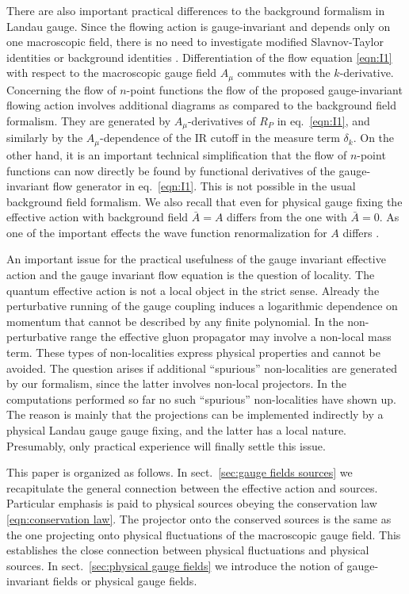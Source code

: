 \documentclass[twocolumn,aps,prd,amsmath,amssymb,preprintnumbers,longbibliography]{revtex4-1}
\numberwithin{equation}{section}
\begin{document}
There are also important practical differences to the background formalism in Landau gauge. Since the flowing action is gauge-invariant and depends only on one macroscopic field, there is no need to investigate modified Slavnov-Taylor identities or background identities \cite{R53,R54,R55,R56,R57,R58,R59}. Differentiation of the flow equation \eqref{eqn:I1} with respect to the macroscopic gauge field $A_\mu$ commutes with the $k$-derivative. Concerning the flow of $n$-point functions the flow of the proposed gauge-invariant flowing action involves additional diagrams as compared to the background field formalism. They are generated by $A_\mu$-derivatives of $R_P$ in eq.~\eqref{eqn:I1}, and similarly by the $A_\mu$-dependence of the IR cutoff in the measure term $\delta_k$. On the other hand, it is an important technical simplification that the flow of $n$-point functions can now directly be found by functional derivatives of the gauge-invariant flow generator in eq.~\eqref{eqn:I1}. This is not possible in the usual background field formalism. We also recall that even for physical gauge fixing the effective action with background field $\bar{A} = A$ differs from the one with $\bar{A} = 0$. As one of the important effects the wave function renormalization for $A$ differs \cite{R17}.

An important issue for the practical usefulness of the gauge invariant effective action and the gauge invariant flow equation is the question of locality. The quantum effective action is not a local object in the strict sense. Already the perturbative running of the gauge coupling induces a logarithmic dependence on momentum that cannot be described by any finite polynomial. In the non-perturbative range the effective gluon propagator may involve a non-local mass term. These types of non-localities express physical properties and cannot be avoided. The question arises if additional ``spurious'' non-localities are generated by our formalism, since the latter involves non-local projectors. In the computations performed so far no such ``spurious'' non-localities have shown up. The reason is mainly that the projections can be implemented indirectly by a physical Landau gauge gauge fixing, and the latter has a local nature. Presumably, only practical experience will finally settle this issue.

This paper is organized as follows. In sect.~\ref{sec:gauge fields sources} we recapitulate the general connection between the effective action and sources. Particular emphasis is paid to physical sources obeying the conservation law \eqref{eqn:conservation law}. The projector onto the conserved sources is the same as the one projecting onto physical fluctuations of the macroscopic gauge field. This establishes the close connection between physical fluctuations and physical sources. In sect.~\ref{sec:physical gauge fields} we introduce the notion of gauge-invariant fields or physical gauge fields.
\end{document}
